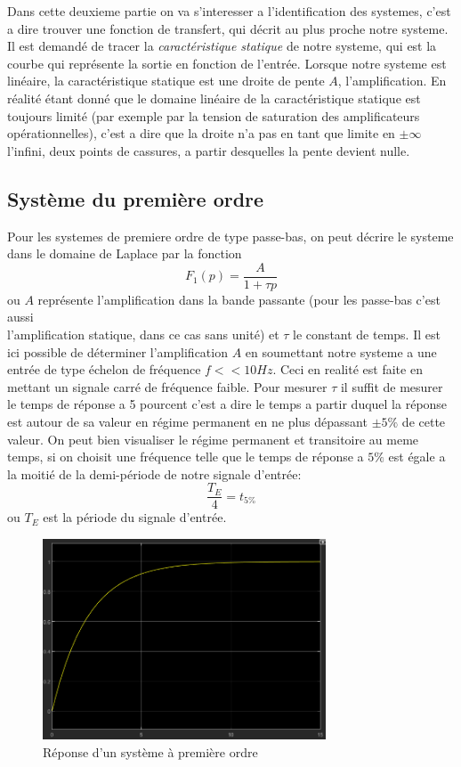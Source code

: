 \documentclass[12pt, a4paper]{report}
\begin{document}
\par
Dans cette deuxieme partie on va s'interesser a l'identification des systemes, c'est a dire 
trouver une fonction de transfert, qui décrit au plus proche notre systeme. Il est demandé de tracer
la \textit{caractéristique statique} de notre systeme, qui est la courbe qui représente la sortie
en fonction de l'entrée. Lorsque notre systeme est linéaire, la caractéristique statique est
une droite de pente $A$, l'amplification. En réalité étant donné que le domaine linéaire de la caractéristique statique est
toujours limité (par exemple par la tension de saturation des amplificateurs opérationnelles), c'est a dire 
que la droite n'a pas en tant que limite en $\pm \infty$ l'infini, deux points de cassures, a partir desquelles
la pente devient nulle.

\subsection{Système du première ordre}

Pour les systemes de premiere ordre de type passe-bas, on peut décrire le systeme dans le domaine de Laplace
par la fonction 
\[
    F_{1}(p) = \frac{A}{1 + \tau p}     
\]
ou $A$ représente l'amplification dans la bande passante (pour les passe-bas c'est aussi\\ l'amplification statique, dans ce cas sans unité)
et $\tau$ le constant de temps. Il est ici possible de déterminer l'amplification $A$ en soumettant notre systeme
a une entrée de type échelon de fréquence $f << 10Hz$. Ceci en realité est faite en mettant un signale carré de fréquence faible. Pour mesurer $\tau$ il suffit de mesurer le temps de réponse a 5 pourcent
c'est a dire le temps a partir duquel la réponse est autour de sa valeur en régime permanent en ne plus dépassant $\pm 5\%$ de cette valeur. On peut bien visualiser
le régime permanent et transitoire au meme temps, si on choisit une fréquence telle que le temps de réponse a $5\%$ est égale a la moitié de la demi-période de notre
signale d'entrée:
\[
    \frac{T_{E}}{4} = t_{5\%}
\]
ou $T_{E}$ est la période du signale d'entrée.
\par

\begin{figure}[h]
    \centering
    \includegraphics[width=0.75\textwidth]{reponse1erordregenerale.png}
    \caption{Réponse d'un système à première ordre}
    \label{fig:reponse1erordre}
\end{figure}
\end{document}
